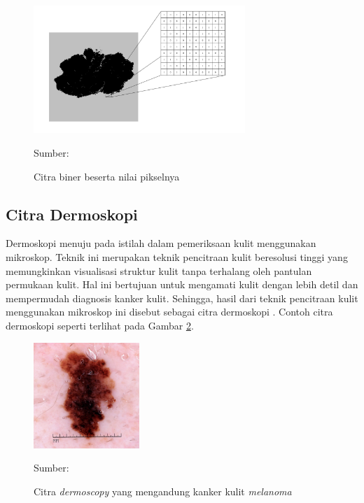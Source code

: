     \begin{figure}[H]
        \begin{center}
            \includegraphics[width=8cm]{../img/Citra Biner - Latex.png}
            \caption{Citra biner beserta nilai pikselnya}
            \label{fig:binary}
            Sumber: \citep{Kusumanto2011}
        \end{center}
    \end{figure}

    \subsection{Citra Dermoskopi}
    Dermoskopi menuju pada istilah dalam pemeriksaan kulit menggunakan mikroskop. Teknik ini merupakan teknik pencitraan kulit beresolusi tinggi yang memungkinkan visualisasi struktur kulit tanpa terhalang oleh pantulan permukaan kulit. Hal ini bertujuan untuk mengamati kulit dengan lebih detil dan mempermudah diagnosis kanker kulit. Sehingga, hasil dari teknik pencitraan kulit menggunakan mikroskop ini disebut sebagai citra dermoskopi \citep{Celebi2019}. Contoh citra dermoskopi seperti terlihat pada Gambar \ref{fig:dermoscopy}.

    \begin{figure}[H]
        \begin{center}
            \includegraphics[width=4cm]{../img/Dermoscopy - Latex.jpg}
            \caption{Citra \textit{dermoscopy} yang mengandung kanker kulit \textit{melanoma}}
            \label{fig:dermoscopy}
            Sumber: \citep{Nersisson2021a}
        \end{center}
    \end{figure}


